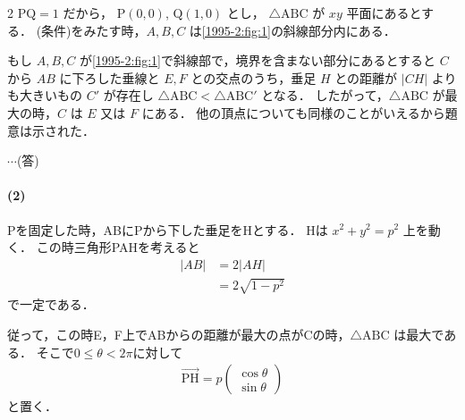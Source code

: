 \documentclass[../../main.tex]{subfiles}
\begin{document}
\begin{multicols}{2}
  $\mathrm{PQ}=1$ だから， $\mathrm{P}(0,0)$, $\mathrm{Q}(1,0)$ とし，
  $\triangle \mathrm{ABC}$ が $xy$ 平面にあるとする．
  (条件)をみたす時，$A,B,C$ は\cref{1995-2:fig:1}の斜線部分内にある．

  もし $A,B,C$ が\cref{1995-2:fig:1}で斜線部で，境界を含まない部分にあるとすると $C$ から $AB$ に下ろした垂線と $E,F$ との交点のうち，垂足 $H$ との距離が $|CH|$ よりも大きいもの $C'$ が存在し
  $\triangle \mathrm{ABC} < \triangle \mathrm{ABC'}$ となる．
  したがって，$\triangle \mathrm{ABC}$ が最大の時，$C$ は $E$ 又は $F$ にある．
  他の頂点についても同様のことがいえるから題意は示された．

  $\cdots$(答)

  \paragraph{(2)}
  Pを固定した時，ABにPから下した垂足をHとする．
  Hは $x^2+y^2=p^2$ 上を動く．
  この時三角形PAHを考えると
  \begin{align}
    |AB|
    & = 2|AH| \\
    & = 2\sqrt{1-p^2}
  \end{align}
  で一定である．

  従って，この時E，F上でABからの距離が最大の点がCの時，$\triangle \mathrm{ABC}$ は最大である．
  そこで$0\le \theta < 2\pi$に対して
  \begin{align}
    \overrightarrow{\mathrm{PH}} = p
    \begin{pmatrix} \cos\theta \\ \sin\theta
    \end{pmatrix}
  \end{align}
  と置く．

  \begin{figure}[H]
    \centering
\end{figure}
\end{multicols}
\end{document}
